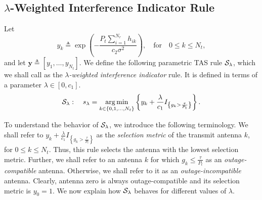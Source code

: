 \documentclass[12pt,draftcls,peerreview,onecolumn]{IEEEtran}
\newcommand{\cbrac}[1]{\left\{{#1}\right\}}
\newcommand{\indic}[1]{I_{\cbrac{#1}}}
\newcommand{\define}{\triangleq}
\DeclareMathOperator*{\argmin}{arg\,min}
\newcommand{\y}{\mathbf{y}}
\newcommand{\nx}{{0}}
\newcommand{\lam}{\lambda}
\newcommand{\slam}{s_{\lam}}
\newcommand{\Nt}{{N_t}}
\newcommand{\Nr}{{N_r}}
\newcommand{\Pt}{{P_t}}
\newcommand{\such}{h}
\newcommand{\puch}{g}
\newcommand{\hk}[1]{{\such_{#1}}}
\newcommand{\gk}[1]{{\puch_{#1}}}
\newcommand{\noisevar}{\sigma^2}
\newcommand{\itau}{\tau}
\newcommand{\cone}{c_{1}}
\newcommand{\ctwo}{c_{2}}
\newcommand{\m}{\cone}
\newcommand{\taubypt}{\frac{\itau}{\Pt}}
\newcommand{\gkgrtaubypt}[1]{{\gk{#1}}>\taubypt}
\newcommand{\gklttaubypt}[1]{{\gk{#1}}\leq\taubypt}
\newcommand{\gindic}[1]{\indic{\gkgrtaubypt{#1}}}
\newcommand{\lambym}{\frac{\lam}{\m}}
\newcommand{\yk}[1]{y_{#1}}
\newcommand{\ykplusgk}[1]{ \yk{#1} + \lambym\gindic{#1}}
\newcommand{\allopts}{\left\{\nx,1,\ldots,\Nt\right\}}
\newcommand{\callamrule}{{\cal S_{{\lam}}}}
\begin{document}
\subsection{$\lam$-Weighted Interference Indicator Rule}
\label{sec:lambda_rule}
Let 
\begin{equation}
\yk{k} \define  \exp\left({- \frac{\Pt\sum_{i=1}^{\Nr}\hk{ik}}{\ctwo\noisevar} }\right), \quad \text{for} \quad 0\leq k \leq\Nt,
\label{eq:yi_def}
\end{equation}
and let $\y \define [\yk{1},\ldots,\yk{\Nt}]$. We define the following parametric TAS rule $\callamrule$, which we shall call as the {\em $\lam$-weighted interference indicator} rule. It is defined in terms of a parameter $\lam \in \left[0, \cone\right]$.
\begin{equation}
\callamrule: \quad\slam=\argmin\limits_{k\in\allopts} \left\{ \ykplusgk{k} \right\}.
\label{eq:lam_weight_rule}
\end{equation}

To understand the behavior of $\callamrule$, we introduce the following terminology. We shall refer to 
$\ykplusgk{k}$
as the {\em selection metric} of the transmit antenna $k$, for $0\leq k \leq\Nt$. Thus, this rule selects the antenna with the lowest selection metric. Further, we shall refer to an antenna $k$ for which $\gklttaubypt{k}$ as an {\em outage-compatible} antenna. Otherwise, we shall refer to it as an {\em outage-incompatible} antenna.  Clearly, antenna zero is always outage-compatible and its selection metric is $\yk{0}=1$. We now explain how $\callamrule$ behaves for different values of $\lam$.
\end{document}
